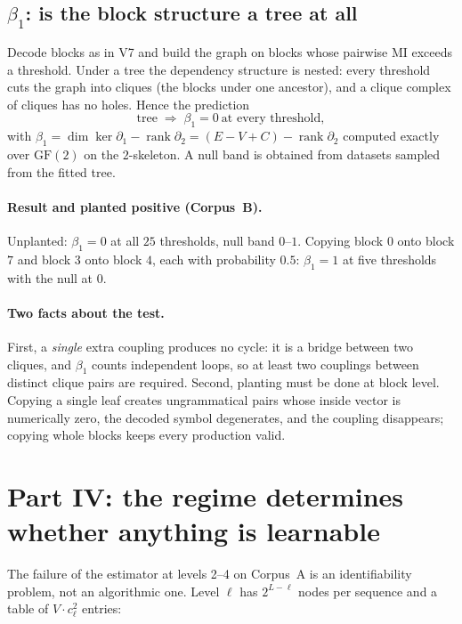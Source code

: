 \documentclass[11pt,a4paper]{article}
\theoremstyle{plain}
\theoremstyle{definition}
\begin{document}
\subsection{$\beta_1$: is the block structure a tree at all}

Decode blocks as in V7 and build the graph on blocks whose pairwise MI exceeds
a threshold. Under a tree the dependency structure is nested: every threshold
cuts the graph into cliques (the blocks under one ancestor), and a clique
complex of cliques has no holes. Hence the prediction
\begin{equation}
  \text{tree} \;\Longrightarrow\; \beta_1 = 0 \ \text{at every threshold},
  \label{eq:betti}
\end{equation}
with $\beta_1 = \dim\ker\partial_1 - \operatorname{rank}\partial_2 =
(E-V+C) - \operatorname{rank}\partial_2$ computed exactly over $\mathrm{GF}(2)$
on the $2$-skeleton. A null band is obtained from datasets sampled from the
fitted tree.

\paragraph{Result and planted positive (Corpus~B).}
Unplanted: $\beta_1 = 0$ at all $25$ thresholds, null band $0$--$1$. Copying
block $0$ onto block $7$ and block $3$ onto block $4$, each with probability
$0.5$: $\beta_1 = 1$ at five thresholds with the null at $0$.

\paragraph{Two facts about the test.}
First, a \emph{single} extra coupling produces no cycle: it is a bridge between
two cliques, and $\beta_1$ counts independent loops, so at least two couplings
between distinct clique pairs are required. Second, planting must be done at
block level. Copying a single leaf creates ungrammatical pairs whose inside
vector is numerically zero, the decoded symbol degenerates, and the coupling
disappears; copying whole blocks keeps every production valid.


\section{Part IV: the regime determines whether anything is learnable}
\label{sec:hier-regime}

The failure of the estimator at levels 2--4 on Corpus~A is an identifiability
problem, not an algorithmic one. Level $\ell$ has $2^{L-\ell}$ nodes per
sequence and a table of $V\cdot c_\ell^2$ entries:
\end{document}
